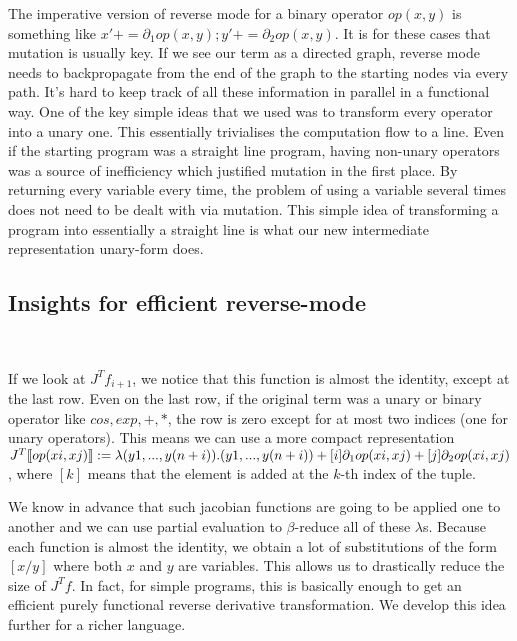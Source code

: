 The imperative version of reverse mode for a binary operator $op(x,y)$ is something like $x'+= \partial_1op(x,y);y'+= \partial_2op(x,y)$. 
It is for these cases that mutation is usually key. 
If we see our term as a directed graph, reverse mode needs to backpropagate from the end of the graph to the starting nodes via every path.
It's hard to keep track of all these information in parallel in a functional way.
One of the key simple ideas that we used was to transform every operator into a unary one. 
This essentially trivialises the computation flow to a line. 
Even if the starting program was a straight line program, 
having non-unary operators was a source of inefficiency which justified mutation in the first place.
By returning every variable every time, the problem of using a variable several times does not need to be dealt with via mutation. 
This simple idea of transforming a program into essentially a straight line is what our new intermediate representation unary-form does. 

\subsection{Insights for efficient reverse-mode}\
\label{subsec:insights}

If we look at $J^Tf_{i+1}$, we notice that this function is almost the identity, except at the last row. 
Even on the last row, if the original term was a unary or binary operator like $cos, exp, +, *$, 
the row is zero except for at most two indices (one for unary operators).
This means we can use a more compact representation $J^T\llbracket op(xi,xj)\rrbracket:=\lambda (y1,...,y(n+i)).(y1,...,y(n+i))+[i]\partial_1op(xi,xj)+[j]\partial_2op(xi,xj)$, 
where $[k]$ means that the element is added at the $k$-th index of the tuple.

We know in advance that such jacobian functions are going to be applied one to another and we can use partial evaluation to $\beta$-reduce all of these $\lambda$s.
Because each function is almost the identity, we obtain a lot of substitutions of the form $[x/y]$ where both $x$ and $y$ are variables. 
This allows us to drastically reduce the size of $J^Tf$. In fact, for simple programs, this is basically enough to get an efficient purely functional reverse derivative transformation.
We develop this idea further for a richer language.
